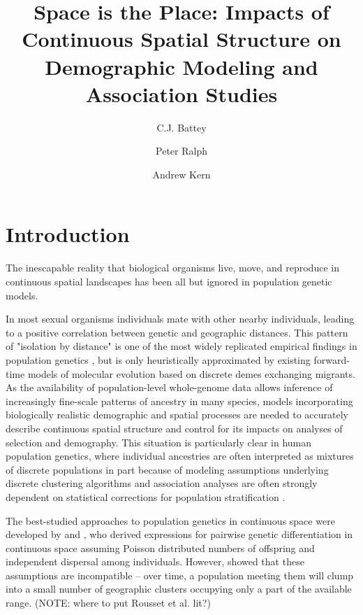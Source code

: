 \documentclass[9pt,twocolumn,twoside,lineno]{gsajnl}
\title{Space is the Place: Impacts of Continuous Spatial Structure on Demographic Modeling and Association Studies}
\author[$\ast$,1]{C.J. Battey}
\author[$\ast$]{Peter Ralph}
\author[$\ast$]{Andrew Kern}
\affil[$\ast$]{University of Oregon Dept. Biology, Institute for Ecology Evolution}
\begin{document}
\maketitle
\thispagestyle{firststyle}
\marginmark
\firstpagefootnote


\vspace{-35pt}%

\section{Introduction}
The inescapable reality that biological organisms live, move, and reproduce in continuous spatial landscapes has been all but ignored in population genetic models. 

In most sexual organisms individuals mate with other nearby individuals, leading to a positive correlation between genetic and geographic distances. This pattern of "isolation by distance" \citep{Wright1943} is one of the most widely replicated empirical findings in population genetics \citep{Chen2017,Jay2012,Sharbel2000}, but is only heuristically approximated by existing forward-time models of molecular evolution based on discrete demes exchanging migrants. As the availability of population-level whole-genome data allows inference of increasingly fine-scale patterns of ancestry in many species, models incorporating biologically realistic demographic and spatial processes are needed to accurately describe continuous spatial structure and control for its impacts on analyses of selection and demography. This situation is particularly clear in human population genetics, where individual ancestries are often interpreted as mixtures of discrete populations in part because of modeling assumptions underlying discrete clustering algorithms and association analyses are often strongly dependent on statistical corrections for population stratification \citep{Berg2018}.  

The best-studied approaches to population genetics in continuous space were developed by \citep{Wright1943} and \citep{Malecot1948}, who derived expressions for pairwise genetic differentiation in continuous space assuming Poisson distributed numbers of offspring and independent dispersal among individuals. However, \citep{Felsenstein1975} showed that these assumptions are incompatible -- over time, a population meeting them will clump into a small number of geographic clusters occupying only a part of the available range. (NOTE: where to put Rousset et al. lit?)
\end{document}
